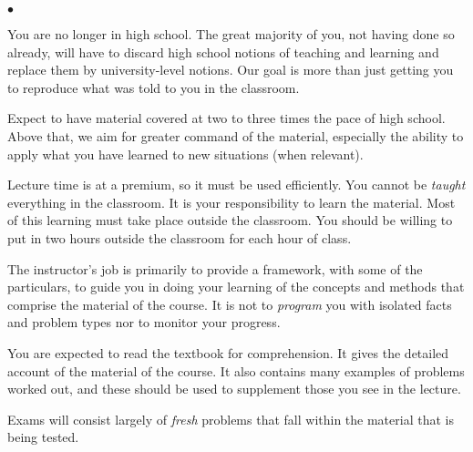 \documentclass[10pt]{article}
\begin{document}
\begin{list}
{$\bullet$}
{\setlength{\itemsep}{-3pt}}

\item You are no longer in high school. The great majority of you, not having done so already, will have to discard high school notions of teaching and learning and replace them by university-level notions.  Our goal is more than just getting you to reproduce what was told to you in the classroom.

\item Expect to have material covered at two to three times the pace of high school. Above that, we aim for greater command of the material, especially the ability to apply what you have learned to new situations (when relevant).

\item Lecture time is at a premium, so it must be used efficiently. You cannot be \textit{taught} everything in the classroom. It is your responsibility to learn the material. Most of this learning must take place outside the classroom. You should be willing to put in two hours outside the classroom for each hour of class.

\item The instructor's job is primarily to provide a framework, with some of the particulars, to guide you in doing your learning of the concepts and methods that comprise the material of the course. It is not to \textit{program} you with isolated facts and problem types nor to monitor your progress.

\item You are expected to read the textbook for comprehension. It gives the detailed account of the material of the course. It also contains many examples of problems worked out, and these should be used to supplement those you see in the lecture. 


\item Exams will consist largely of \textit{fresh} problems that fall within the material that is being tested.

\end{list}
\end{document}
